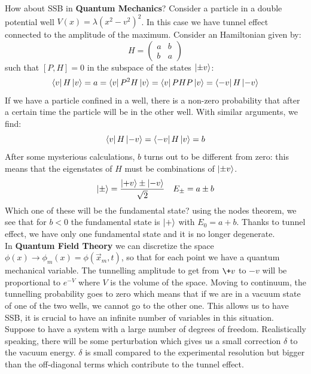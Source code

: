 \documentclass[../main.tex]{subfiles}
\begin{document}
How about SSB in \textbf{Quantum Mechanics}? Consider a particle in a double potential well $V(x)=\lambda(x^2-v^2)^2$. In this case we have tunnel effect connected to the amplitude of the maximum. Consider an Hamiltonian given by:
\[
H=\left(\begin{array}{cc}
    a & b \\
    b & a
\end{array}\right)
\]
such that $[P,H]=0$ in the subspace of the states $\ket{\pm v}$:
\[
\bra{v}H\ket{v}=a=\bra{v}P^2H\ket{v}=\bra{v}PHP\ket{v}=\bra{-v}H\ket{-v}
\]
If we have a particle confined in a well, there is a non-zero probability that after a certain time the particle will be in the other well. With similar arguments, we find:
\[
\bra{v}H\ket{-v}=\bra{-v}H\ket{v}=b
\]
After some mysterious calculations, $b$ turns out to be different from zero: this means that the eigenstates of $H$ must be combinations of $\ket{\pm v}$.
\[
\ket{\pm}=\frac{\ket{+v}\pm\ket{-v}}{\sqrt{2}} \quad E_\pm=a\pm b
\]
Which one of these will be the fundamental state? using the nodes theorem, we see that for $b<0$ the fundamental state is $\ket{+}$ with $E_0=a+b$. Thanks to tunnel effect, we have only one fundamental state and it is no longer degenerate.\\
In \textbf{Quantum Field Theory} we can discretize the space\\
$\phi(x)\to\phi_m(x)=\phi(\Vec{x}_m,t)$, so that for each point we have a quantum mechanical variable. The tunnelling amplitude to get from $\+v$ to $-v$ will be proportional to $e^{-V}$ where $V$ is the volume of the space. Moving to continuum, the tunnelling probability goes to zero which means that if we are in a vacuum state of one of the two wells, we cannot go to the other one. This allows us to have SSB, it is crucial to have an infinite number of variables in this situation.\\
Suppose to have a system with a large number of degrees of freedom. Realistically speaking, there will be some perturbation which gives us a small correction $\delta$ to the vacuum energy. $\delta$ is small compared to the experimental resolution but bigger than the off-diagonal terms which contribute to the tunnel effect. 
\end{document}
